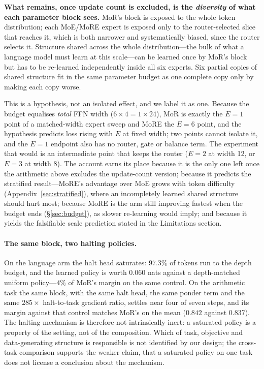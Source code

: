 \textbf{What remains, once update count is excluded, is the \emph{diversity} of
what each parameter block sees.} MoR's block is exposed to the whole token
distribution; each MoE/MoRE expert is exposed only to the router-selected slice
that reaches it, which is both narrower and systematically biased, since the
router selects it. Structure shared across the whole distribution---the bulk of
what a language model must learn at this scale---can be learned once by MoR's
block but has to be re-learned independently inside all six experts. Six partial
copies of shared structure fit in the same parameter budget as one complete copy
only by making each copy worse.

This is a hypothesis, not an isolated effect, and we label it as one. Because the
budget equalises \emph{total} FFN width ($6 \times 4 = 1 \times 24$), MoR is
exactly the $E{=}1$ point of a matched-width expert sweep and MoRE the $E{=}6$
point, and the hypothesis predicts loss rising with $E$ at fixed width; two points
cannot isolate it, and the $E{=}1$ endpoint also has no router, gate or balance
term. The experiment that would is an intermediate point that keeps the router
($E{=}2$ at width 12, or $E{=}3$ at width 8). The
account earns its place because it is the only one left once the
arithmetic above excludes the update-count version; because it predicts the
stratified result---MoRE's advantage over MoE grows with token difficulty
(Appendix~\ref{sec:stratified}), where an incompletely learned shared structure should hurt
most; because MoRE is the arm still improving fastest when the budget ends
(\S\ref{sec:budget}), as slower re-learning would imply; and because it yields the
falsifiable scale prediction stated in the Limitations section.

\paragraph{The same block, two halting policies.}
On the language arm the halt head saturates: $97.3\%$ of tokens run to the depth
budget, and the learned policy is worth $0.060$ nats against a depth-matched
uniform policy---$4\%$ of MoR's margin on the same control. On the arithmetic
task the same block, with the same halt head, the same ponder term and the same
$285\times$ halt-to-task gradient ratio, settles near four of seven steps, and
its margin against that control matches MoR's on the mean ($0.842$ against
$0.837$). The halting mechanism is therefore not intrinsically inert: a saturated
policy is a property of the setting, not of the composition. Which of task,
objective and data-generating structure is responsible is not identified by our
design; the cross-task comparison supports the weaker claim, that a saturated
policy on one task does not license a conclusion about the mechanism.

